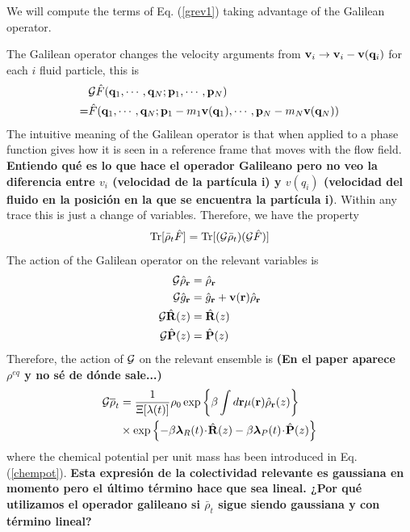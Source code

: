 \documentclass[b5paper,openright,11pt]{book}
\newcommand{\esc}{\!\cdot\!}
\newcommand{\Note}[1]{{\bf \color{red}#1}}    %
\begin{document}
We will compute the terms of Eq. (\ref{grev1}) taking advantage of the Galilean operator. 


The Galilean operator changes the velocity arguments from ${\bf v}_i\to {\bf v}_i-{\bf v}({\bf q}_i)$ for each $i$ fluid particle, this is
\begin{align}
&  {\cal G}\hat{F}({\bf q}_1,\cdots,{\bf q}_N;{\bf p}_1,\cdots,{\bf p}_N)
\nonumber\\
=&\hat{F}({\bf q}_1,\cdots,{\bf q}_N;{\bf p}_1-m_1{\bf v}({\bf q}_1),\cdots,{\bf p}_N-m_N{\bf v}({\bf q}_N))
\end{align}
The intuitive meaning of the Galilean operator is that when applied to a phase function gives how it is seen in a reference frame that moves with the flow field. \Note{Entiendo qué es lo que hace el operador Galileano pero no veo la diferencia entre $v_i$ (velocidad de la partícula i) y $v(q_i)$ (velocidad del fluido en la posición en la que se encuentra la partícula i)}. Within any trace this is just a change of variables. Therefore, we have the property
\begin{align}
  {\rm Tr}[\bar{\rho}_t\hat{F}] &= {\rm Tr}[({\cal G}\bar{\rho}_t)({\cal G}\hat{F})] \nonumber \\
  \label{Gprop}
\end{align}
The action of the Galilean operator on the relevant variables is
\begin{align}
  {\cal G}\hat{\rho}_{\bf r} &= \hat{\rho}_{\bf r} \nonumber\\
  {\cal G}\hat{g}_{\bf r} &= \hat{g}_{\bf r} + {\bf v}({\bf r})\hat{\rho}_{\bf r} \nonumber \\
  {\cal G}\hat{\bf R}(z) &= \hat{\bf R}(z) \nonumber\\
  {\cal G}\hat{\bf P}(z) &= \hat{\bf P}(z)
\end{align}
Therefore, the action of ${\cal G}$ on the relevant ensemble is \Note{(En el paper aparece $\rho^{eq}$ y no sé de dónde sale...)}
\begin{align}
  {\cal G}\overline{\rho}_t &=
\frac{1}{\Xi[\lambda(t)]}\rho_0
\exp\left\{\beta\int d{\bf r}\mu({\bf r})\hat{\rho}_{\bf r}(z)\right\}
\nonumber\\
&\times
\exp\left\{-\beta \boldsymbol{\lambda}_{R}(t)\esc\hat{\bf R}(z)
-\beta \boldsymbol{\lambda}_{P}(t)\esc\hat{\bf P}(z)\right\}
\label{resrelens}
\end{align}
where  the chemical  potential per  unit mass  has been  introduced in
Eq.  (\ref{chempot}).  \Note{Esta expresión de la colectividad relevante es gaussiana en momento pero el último término hace que sea lineal. ¿Por qué utilizamos el operador galileano si $\bar{\rho}_t$ sigue siendo gaussiana y con término lineal?}
\end{document}

